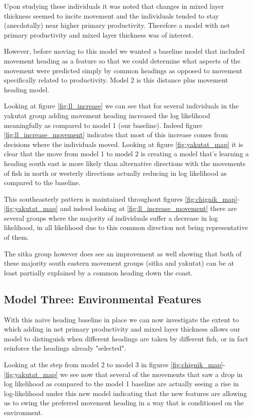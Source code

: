 \documentclass[11pt]{article}
\begin{document}
Upon studying these individuals it was noted that changes in mixed layer thickness seemed to incite movement and the individuals tended to stay (anecdotally) near higher primary productivity. Therefore a model with net primary productivity and mixed layer thickness was of interest. 

However, before moving to this model we wanted a baseline model that included movement heading as a feature so that we could determine what aspects of the movement were predicted simply by common headings as opposed to movement specifically related to productivity. Model 2 is this distance plus movement heading model. 

Looking at figure \ref{fig:ll_increase} we can see that for several individuals in the yakutat group adding movement heading increased the log likelihood meaningfully as compared to model 1 (our baseline). 
Indeed figure \ref{fig:ll_increase_movement} indicates that most of this increase comes from decisions where the individuals moved. Looking at figure \ref{fig:yakutat_map} it is clear that the move from model 1 to model 2 is creating a model that's learning a heading south east is more likely than alternative directions with the movements of fish in north or westerly directions actually reducing in log likelihood as compared to the baseline. 

This southeasterly pattern is maintained throughout figures \ref{fig:chignik_map}-\ref{fig:yakutat_map} and indeed looking at \ref{fig:ll_increase_movement} there are several groups where the majority of individuals suffer a decrease in log likelihood, in all likelihood due to this common direction not being representative of them.  

The sitka group however does see an improvement as well showing that both of these majority south eastern movement groups (sitka and yakutat) can be at least partially explained by a common heading down the coast. 

\subsection*{Model Three: Environmental Features}
With this naive heading baseline in place we can now investigate the extent to which adding in net primary productivity and mixed layer thickness allows our model to distinguish when different headings are taken by different fish, or in fact reinforce the headings already "selected". 

Looking at the step from model 2 to model 3 in figures \ref{fig:chignik_map}-\ref{fig:yakutat_map} we see now that several of the movements that saw a drop in log likelihood as compared to the model 1 baseline are actually seeing a rise in log-likelihood under this new model indicating that the new features are allowing us to swing the preferred movement heading in a way that is conditioned on the environment. 
\end{document}
